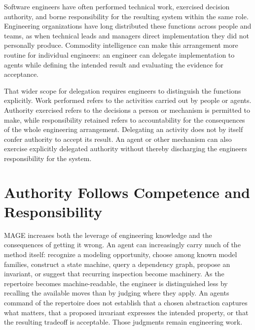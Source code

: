 Software engineers have often performed technical work, exercised decision authority, and borne responsibility for the resulting system within the same role. Engineering organizations have long distributed these functions across people and teams, as when technical leads and managers direct implementation they did not personally produce. Commodity intelligence can make this arrangement more routine for individual engineers: an engineer can delegate implementation to agents while defining the intended result and evaluating the evidence for acceptance.

That wider scope for delegation requires engineers to distinguish the functions explicitly. Work performed refers to the activities carried out by people or agents. Authority exercised refers to the decisions a person or mechanism is permitted to make, while responsibility retained refers to accountability for the consequences of the whole engineering arrangement. Delegating an activity does not by itself confer authority to accept its result. An agent or other mechanism can also exercise explicitly delegated authority without thereby discharging the engineer\textquotesingle s responsibility for the system.

\section{Authority Follows Competence and Responsibility}\label{heading:authority-follows-competence-and-responsibility}


MAGE increases both the leverage of engineering knowledge and the consequences of getting it wrong. An agent can increasingly carry much of the method itself: recognize a modeling opportunity, choose among known model families, construct a state machine, query a dependency graph, propose an invariant, or suggest that recurring inspection become machinery. As the repertoire becomes machine-readable, the engineer is distinguished less by recalling the available moves than by judging where they apply. An agent\textquotesingle s command of the repertoire does not establish that a chosen abstraction captures what matters, that a proposed invariant expresses the intended property, or that the resulting tradeoff is acceptable. Those judgments remain engineering work.


